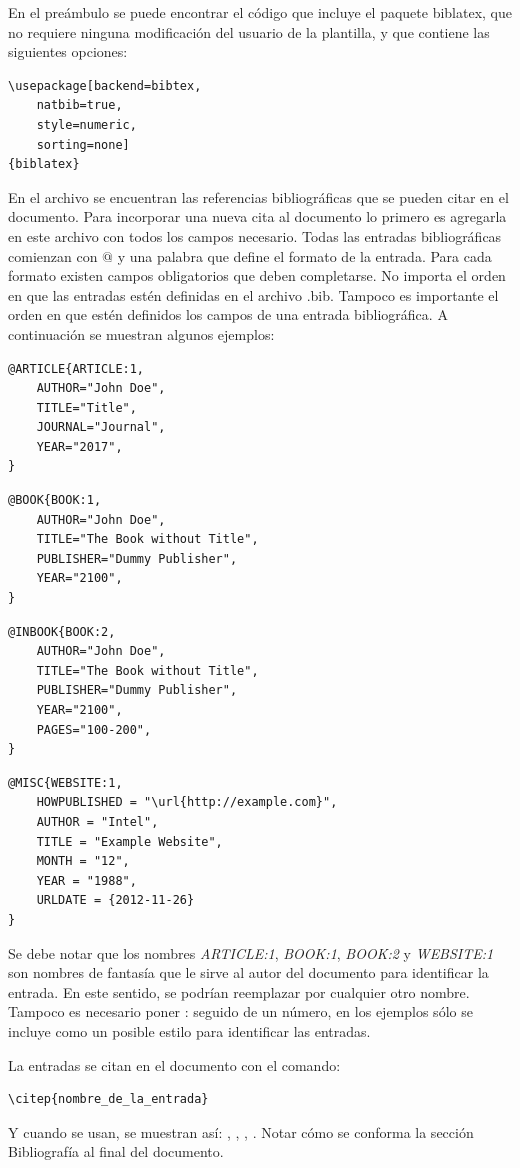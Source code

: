 En el preámbulo se puede encontrar el código que incluye el paquete biblatex, que no requiere ninguna modificación del usuario de la plantilla, y que contiene las siguientes opciones:

\begin{lstlisting}
\usepackage[backend=bibtex,
	natbib=true, 
	style=numeric, 
	sorting=none]
{biblatex}
\end{lstlisting}

En el archivo  se encuentran las referencias bibliográficas que se pueden citar en el documento.  Para incorporar una nueva cita al documento lo primero es agregarla en este archivo con todos los campos necesario.  Todas las entradas bibliográficas comienzan con $@$ y una palabra que define el formato de la entrada.  Para cada formato existen campos obligatorios que deben completarse. No importa el orden en que las entradas estén definidas en el archivo .bib.  Tampoco es importante el orden en que estén definidos los campos de una entrada bibliográfica. A continuación se muestran algunos ejemplos:

\begin{lstlisting}
@ARTICLE{ARTICLE:1,
    AUTHOR="John Doe",
    TITLE="Title",
    JOURNAL="Journal",
    YEAR="2017",
}
\end{lstlisting}


\begin{lstlisting}
@BOOK{BOOK:1,
    AUTHOR="John Doe",
    TITLE="The Book without Title",
    PUBLISHER="Dummy Publisher",
    YEAR="2100",
}
\end{lstlisting}


\begin{lstlisting}
@INBOOK{BOOK:2,
    AUTHOR="John Doe",
    TITLE="The Book without Title",
    PUBLISHER="Dummy Publisher",
    YEAR="2100",
    PAGES="100-200",
}
\end{lstlisting}


\begin{lstlisting}
@MISC{WEBSITE:1,
    HOWPUBLISHED = "\url{http://example.com}",
    AUTHOR = "Intel",
    TITLE = "Example Website",
    MONTH = "12",
    YEAR = "1988",
    URLDATE = {2012-11-26}
}
\end{lstlisting}

Se debe notar que los nombres \emph{ARTICLE:1}, \emph{BOOK:1}, \emph{BOOK:2} y \emph{WEBSITE:1} son nombres de fantasía que le sirve al autor del documento para identificar la entrada. En este sentido, se podrían reemplazar por cualquier otro nombre.  Tampoco es necesario poner : seguido de un número, en los ejemplos sólo se incluye como un posible estilo para identificar las entradas.

La entradas se citan en el documento con el comando: 

\begin{verbatim}
\citep{nombre_de_la_entrada}
\end{verbatim}

Y cuando se usan, se muestran así: \citep{ARTICLE:1}, \citep{BOOK:1}, \citep{BOOK:2}, \citep{WEBSITE:1}.  Notar cómo se conforma la sección Bibliografía al final del documento. 
